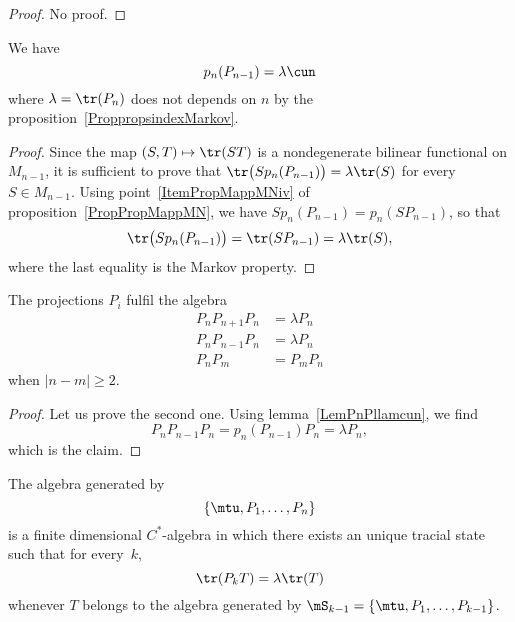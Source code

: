 \begin{proof}
No proof.
\end{proof}

\begin{lemma}		\label{LemPnPllamcun}
We have
\begin{equation}
	p_n(P_{n-1})=\lambda\cun
\end{equation}
where $\lambda=\tr(P_n)$ does not depends on $n$ by the proposition~\ref{ProppropsindexMarkov}.
\end{lemma}

\begin{proof}
Since the map $(S,T)\mapsto\tr(ST)$ is a nondegenerate bilinear functional on $M_{n-1}$, it is sufficient to prove that $\tr\big( Sp_n(P_{n-1}) \big)=\lambda\tr(S)$ for every $S\in M_{n-1}$. Using point~\ref{ItemPropMappMNiv} of proposition~\ref{PropPropMappMN}, we have $Sp_n(P_{n-1})=p_n(SP_{n-1})$, so that
\begin{equation}
	\tr\big( Sp_n(P_{n-1}) \big)=\tr(SP_{n-1})=\lambda\tr(S),
\end{equation}
where the last equality is the Markov property.
\end{proof}

\begin{proposition}		\label{PropAlgPPPKoi}
	The projections $P_i$ fulfil the algebra
	\begin{subequations}		\label{SubeqPnPalgPPI}
	\begin{align}
		P_nP_{n+1}P_n&=\lambda P_n		\label{EqLoiPPun}		\\
		P_nP_{n-1}P_n&=\lambda P_n		\label{EqLoiPPdeux}		\\
		P_nP_m&=P_mP_n				\label{EqLoiPPtrois}
	\end{align}
	\end{subequations}
	when $| n-m |\geq 2$.
\end{proposition}

\begin{proof}
	Let us prove the second one. Using lemma~\ref{LemPnPllamcun}, we find
	\begin{equation}
		P_nP_{n-1}P_n=p_n(P_{n-1})P_n = \lambda P_n,
	\end{equation}
	which is the claim.
\end{proof}

\begin{corollary}
	The algebra generated by
	\begin{equation}
		\{ \mtu,P_1,\ldots, P_n\}
	\end{equation}
	is a finite dimensional $C^*$-algebra in which there exists an unique tracial state such that for every~$k$,
	\begin{equation}
		\tr(P_kT)=\lambda \tr(T)
	\end{equation}
	whenever $T$ belongs to the algebra generated by $\mS_{k-1}=\{ \mtu,P_1,\ldots,P_{k-1} \}$.
\end{corollary}

